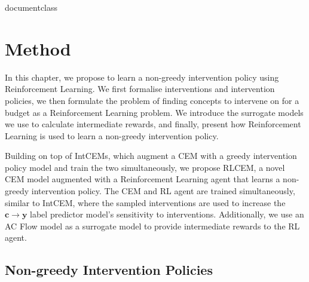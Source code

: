 \csname documentclass

\chapter{Method}\label{chapter-3}


In this chapter, we propose 
to learn a non-greedy intervention policy using Reinforcement Learning.
We first
formalise interventions and intervention policies,
we then formulate the problem of 
finding concepts to intervene on for a budget as a Reinforcement Learning problem. We introduce
the surrogate models we use
to calculate intermediate rewards,
and finally, present how Reinforcement Learning is used 
to learn a non-greedy intervention policy.

Building on top of IntCEMs, which augment a CEM
with a greedy intervention policy model and train the two simultaneously,
we propose RLCEM,
a novel CEM model augmented with a Reinforcement Learning agent
that learns a non-greedy intervention policy.
The CEM and RL agent are trained simultaneously, similar to IntCEM, 
where the sampled interventions are used to increase the
$\mathbf{c} \to \mathbf{y}$ label predictor model's sensitivity to interventions. Additionally, we use an AC Flow model as a surrogate model to provide
intermediate rewards to the RL agent.


\section{Non-greedy Intervention Policies}
\label{method:non-greedy-policies}

